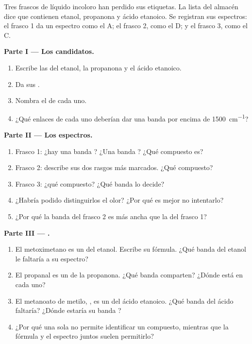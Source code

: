 \begin{problem}
\label{pb:g11:infrared:1}
Tres frascos de líquido incoloro han perdido sus etiquetas. La lista
del almacén dice que contienen etanol, propanona y ácido etanoico. Se
registran sus espectros: el frasco 1 da un espectro como el A; el
frasco 2, como el D; y el frasco 3, como el C.

\medskip
\noindent\textbf{Parte I --- Los candidatos.}
\begin{enumerate}
  \item Escribe las  del etanol, la propanona
        y el ácido etanoico.
  \item Da sus .
  \item Nombra el  de cada uno.
  \item ¿Qué enlaces de cada uno deberían dar una banda por encima de
        \qty{1500}{cm^{-1}}?
\end{enumerate}

\medskip
\noindent\textbf{Parte II --- Los espectros.}
\begin{enumerate}[resume]
  \item Frasco 1: ¿hay una banda ? ¿Una banda ? ¿Qué
        compuesto es?
  \item Frasco 2: describe sus dos rasgos más marcados. ¿Qué compuesto?
  \item Frasco 3: ¿qué compuesto? ¿Qué banda lo decide?
  \item ¿Habría podido distinguirlos el olor? ¿Por qué es mejor no
        intentarlo?
  \item ¿Por qué la banda  del frasco 2 es más ancha que la del
        frasco 1?
\end{enumerate}

\medskip
\noindent\textbf{Parte III --- .}
\begin{enumerate}[resume]
  \item El metoximetano es un  del etanol. Escribe su fórmula.
        ¿Qué banda del etanol le faltaría a su espectro?
  \item El propanal es un  de la propanona. ¿Qué banda comparten?
        ¿Dónde está en cada uno?
  \item El metanoato de metilo, , es un  del ácido
        etanoico. ¿Qué banda del ácido faltaría? ¿Dónde estaría su banda
        ?
  \item ¿Por qué una  sola no permite identificar un
        compuesto, mientras que la fórmula y el espectro juntos suelen
        permitirlo?
\end{enumerate}


\end{problem}
